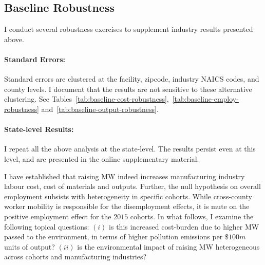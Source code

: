 \documentclass[12pt, english]{article}
\begin{document}
    \subsection{Baseline Robustness}\label{subsec:baseline-robustness}
    I conduct several robustness exercises to supplement industry results presented above.

    \paragraph{Standard Errors:} Standard errors are clustered at the facility, zipcode, industry NAICS codes, and county levels. I document that the results are not sensitive to these alternative clustering. See Tables~\ref{tab:baseline-cost-robustness},~\ref{tab:baseline-employ-robustness} and~\ref{tab:baseline-output-robustness}.
    
    
    

    \paragraph{State-level Results:} I repeat all the above analysis at the state-level. The results persist even at this level, and are presented in the online supplementary material.

    I have established that raising MW indeed increases manufacturing industry labour cost, cost of materials and outputs. Further, the null hypothesis on overall employment subsists with heterogeneity in specific cohorts. While cross-county worker mobility is responsible for the disemployment effects, it is mute on the positive employment effect for the $2015$ cohorts. In what follows, I examine the following topical questions: $(i)$ is this increased cost-burden due to higher MW passed to the environment, in terms of higher pollution emissions per $\$100m$ units of output? $(ii)$ is the environmental impact of raising MW heterogeneous across cohorts and manufacturing industries?
\end{document}
